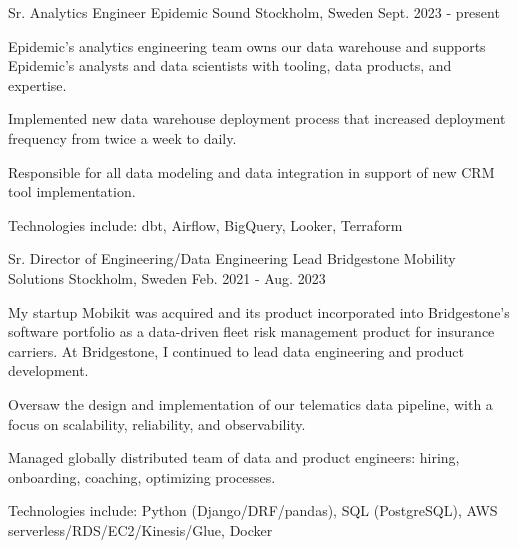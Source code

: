 

\begin{cventries}

  \cventry
    {Sr. Analytics Engineer} %
    {Epidemic Sound} %
    {Stockholm, Sweden} %
    {Sept. 2023 - present} %
    {
    Epidemic's analytics engineering team owns our data warehouse and supports Epidemic's analysts
    and data scientists with tooling, data products, and expertise.
    \vspace{5.0mm}
      \begin{cvitems} %
        \item {Implemented new data warehouse deployment process that increased deployment frequency from twice a week to daily.}
        \item {Responsible for all data modeling and data integration in support of new CRM tool implementation.}
        \item {Technologies include: dbt, Airflow, BigQuery, Looker, Terraform}
      \end{cvitems}
    }

  \cventry
    {Sr. Director of Engineering/Data Engineering Lead} %
    {Bridgestone Mobility Solutions} %
    {Stockholm, Sweden} %
    {Feb. 2021 - Aug. 2023} %
    {
    My startup Mobikit was acquired and its product incorporated into Bridgestone's software portfolio as a data-driven fleet risk management product for insurance carriers. At Bridgestone, I continued to lead data engineering and product development.
    \vspace{5.0mm}
      \begin{cvitems} %
        \item {Oversaw the design and implementation of our telematics data pipeline, with a focus on scalability, reliability, and observability.}
        \item {Managed globally distributed team of data and product engineers: hiring, onboarding, coaching, optimizing processes.}
        \item {Technologies include: Python (Django/DRF/pandas), SQL (PostgreSQL), AWS serverless/RDS/EC2/Kinesis/Glue, Docker}
      \end{cvitems}
    }


\end{cventries}
